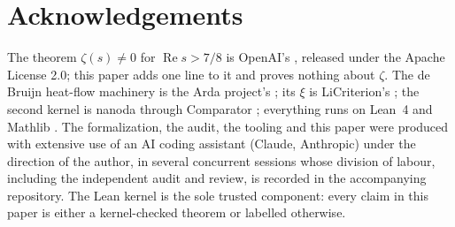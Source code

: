 \documentclass[11pt]{article}
\theoremstyle{definition}
\newcommand{\re}{\operatorname{Re}}
\begin{document}
\section*{Acknowledgements}

The theorem $\zeta(s) \ne 0$ for $\re s > 7/8$ is OpenAI's \cite{OAIqrh,OAImath}, released under the Apache License 2.0; this paper adds one line to it and proves nothing about $\zeta$. The de Bruijn heat-flow machinery is the Arda project's \cite{Arda}; its $\xi$ is LiCriterion's \cite{LiCrit}; the second kernel is nanoda \cite{nanoda} through Comparator \cite{Comparator}; everything runs on Lean~4 and Mathlib \cite{Lean,Mathlib}. The formalization, the audit, the tooling and this paper were produced with extensive use of an AI coding assistant (Claude, Anthropic) under the direction of the author, in several concurrent sessions whose division of labour, including the independent audit and review, is recorded in the accompanying repository. The Lean kernel is the sole trusted component: every claim in this paper is either a kernel-checked theorem or labelled otherwise.
\end{document}
